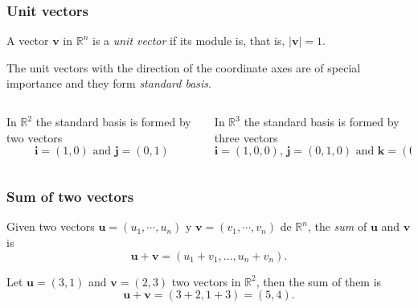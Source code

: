 \begin{frame}
\frametitle{Unit vectors}
\begin{definition}
A vector $\mathbf{v}$ in $\mathbb{R}^n$ is a \emph{unit vector} if its module is, that is, $|\mathbf{v}|=1$.
\end{definition}

The unit vectors with the direction of the coordinate axes are of special importance and they form \emph{standard basis}.

\begin{columns}
\begin{column}{.48\textwidth}
In $\mathbb{R}^2$ the standard basis is formed by two vectors
\[
\mathbf{i}=(1,0)\mbox{ and }\mathbf{j}=(0,1)
\]
\begin{center}

\end{center}
\end{column}
\begin{column}{.48\textwidth}
In $\mathbb{R}^3$ the standard basis is formed by three vectors
\[
\mathbf{i}=(1,0,0)\mbox{, }\mathbf{j}=(0,1,0) \mbox{ and } \mathbf{k}=(0,0,1)
\]
\begin{center}

\end{center}
\end{column}
\end{columns}
\end{frame}


\begin{frame}
\frametitle{Sum of two vectors}
\begin{definition}
Given two vectors $\mathbf{u}=(u_1,\cdots,u_n)$ y $\mathbf{v}=(v_1,\cdots,v_n)$ de $\mathbb{R}^n$, the \emph{sum} of $\mathbf{u}$ and $\mathbf{v}$ is
\[
\mathbf{u}+\mathbf{v} = (u_1+v_1,\ldots, u_n+v_n).
\]
\end{definition}

Let $\mathbf{u}=(3,1)$ and $\mathbf{v}=(2,3)$ two vectors in $\mathbb{R}^2$, then the sum of them is 
\[
\mathbf{u}+\mathbf{v} = (3+2,1+3) = (5,4).
\]

\begin{center}

\end{center}
\end{frame}



